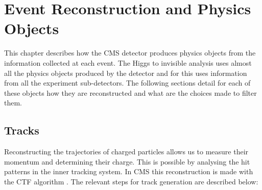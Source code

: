 \chapter{Event Reconstruction and Physics Objects}
\label{CHAPTER:EventReconstructionPhysicsObjects}

\glsresetall %

This chapter describes how the \gls{CMS} detector produces physics objects from the information collected at each event. The  Higgs to invisible analysis uses almost all the physics objects produced by the detector and for this uses information from all the experiment sub-detectors. The following sections detail for each of these objects how they are reconstructed and what are the choices made to filter them.

\section{Tracks}
\label{SECTION:EventReconstructionPhysicsObjects_Tracks}


Reconstructing the trajectories of charged particles allows us to measure their momentum and determining their charge. This is possible by analysing the hit patterns in the inner tracking system. In \gls{CMS} this reconstruction is made with the \gls{CTF} algorithm \cite{ARTICLE:CMSTrackReconstruction}. The relevant steps for track generation are described below:

